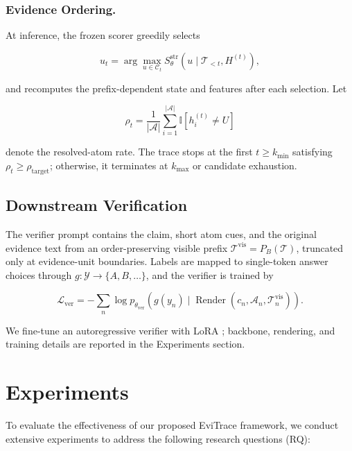 \documentclass[letterpaper]{article}
\begin{document}
\subsubsection{Evidence Ordering.}

At inference, the frozen scorer greedily selects

\[
u_t=\arg\max_{u\in\mathcal C_t}
S_\theta^{\mathrm{str}}
(u\mid\mathcal T_{<t},H^{(t)}),
\]

and recomputes the prefix-dependent state and features after each
selection. Let

\[
\rho_t=
\frac{1}{|\mathcal A|}
\sum_{i=1}^{|\mathcal A|}
\mathbb I[h_i^{(t)}\ne U]
\]

denote the resolved-atom rate. The trace stops at the first
$t\ge k_{\min}$ satisfying
$\rho_t\ge\rho_{\mathrm{target}}$; otherwise, it terminates at
$k_{\max}$ or candidate exhaustion.

\subsection{Downstream Verification}

The verifier prompt contains the claim, short atom cues, and the
original evidence text from an order-preserving visible prefix
$\mathcal T^{\mathrm{vis}}=P_B(\mathcal T)$, truncated only at
evidence-unit boundaries. Labels are mapped to single-token answer
choices through
$g:\mathcal Y\rightarrow\{A,B,\ldots\}$, and the verifier is trained by

\[
\mathcal L_{\mathrm{ver}}
=-\sum_n
\log p_{\theta_{\mathrm{ver}}}
\left(
g(y_n)\mid
\operatorname{Render}
(c_n,\mathcal A_n,\mathcal T_n^{\mathrm{vis}})
\right).
\]

We fine-tune an autoregressive verifier with LoRA
\citep{Hu2022LoRA}; backbone, rendering, and training details are
reported in the Experiments section.

\section{Experiments}

To evaluate the effectiveness of our proposed EviTrace framework, we conduct extensive experiments to address the following research questions (RQ): 
\end{document}
